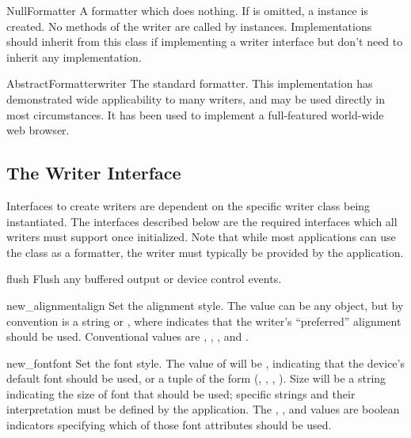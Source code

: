 \renewcommand{\indexsubitem}{(in module formatter)}

\begin{funcdesc}{NullFormatter}{}
A formatter which does nothing.  If  is omitted, a
 instance is created.  No methods of the writer are
called by  instances.  Implementations should inherit
from this class if implementing a writer interface but don't need to
inherit any implementation.
\end{funcdesc}

\begin{funcdesc}{AbstractFormatter}{writer}
The standard formatter.  This implementation has demonstrated wide
applicability to many writers, and may be used directly in most
circumstances.  It has been used to implement a full-featured
world-wide web browser.
\end{funcdesc}



\subsection{The Writer Interface}

Interfaces to create writers are dependent on the specific writer
class being instantiated.  The interfaces described below are the
required interfaces which all writers must support once initialized.
Note that while most applications can use the 
class as a formatter, the writer must typically be provided by the
application.

\renewcommand{\indexsubitem}{(writer object method)}

\begin{funcdesc}{flush}{}
Flush any buffered output or device control events.
\end{funcdesc}

\begin{funcdesc}{new_alignment}{align}
Set the alignment style.  The  value can be any object,
but by convention is a string or , where 
indicates that the writer's ``preferred'' alignment should be used.
Conventional  values are , ,
, and .
\end{funcdesc}

\begin{funcdesc}{new_font}{font}
Set the font style.  The value of  will be ,
indicating that the device's default font should be used, or a tuple
of the form (, , , ).
Size will be a string indicating the size of font that should be used;
specific strings and their interpretation must be defined by the
application.  The , , and  values
are boolean indicators specifying which of those font attributes
should be used.
\end{funcdesc}

